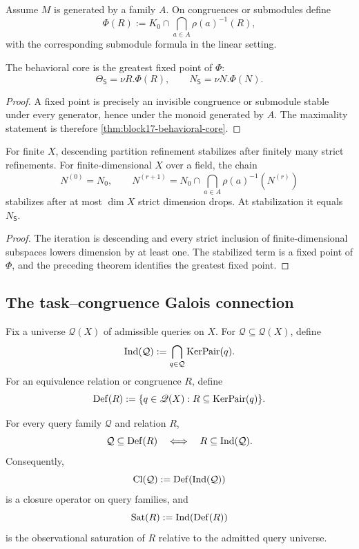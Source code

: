Assume \(M\) is generated by a family \(A\).  On congruences or submodules define
\[
 \Phi(R)
 :=
 K_0\cap\bigcap_{a\in A}\rho(a)^{-1}(R),
\]
with the corresponding submodule formula in the linear setting.

\begin{theorem}
\label{thm:block17-coinductive-characterization}
The behavioral core is the greatest fixed point of \(\Phi\):
\[
 \Theta_{\mathsf S}=\nu R.\Phi(R),
 \qquad
 N_{\mathsf S}=\nu N.\Phi(N).
\]
\end{theorem}

\begin{proof}
A fixed point is precisely an invisible congruence or submodule stable under every generator, hence under the monoid generated by \(A\).  The maximality statement is therefore \cref{thm:block17-behavioral-core}.
\end{proof}

\begin{corollary}
\label{cor:block17-finite-certification}
For finite \(X\), descending partition refinement stabilizes after finitely many strict refinements.  For finite-dimensional \(X\) over a field, the chain
\[
 N^{(0)}=N_0,
 \qquad
 N^{(r+1)}=
 N_0\cap\bigcap_{a\in A}\rho(a)^{-1}(N^{(r)})
\]
stabilizes after at most \(\dim X\) strict dimension drops.  At stabilization it equals \(N_{\mathsf S}\).
\end{corollary}

\begin{proof}
The iteration is descending and every strict inclusion of finite-dimensional subspaces lowers dimension by at least one.  The stabilized term is a fixed point of \(\Phi\), and the preceding theorem identifies the greatest fixed point.
\end{proof}

\subsection{The task--congruence Galois connection}
\label{subsec:block17-task-galois}

Fix a universe \(\mathscr Q(X)\) of admissible queries on \(X\).  For \(\mathcal Q\subseteq\mathscr Q(X)\), define
\[
 \operatorname{Ind}(\mathcal Q)
 :=
 \bigcap_{q\in\mathcal Q}\operatorname{KerPair}(q).
\]
For an equivalence relation or congruence \(R\), define
\[
 \operatorname{Def}(R)
 :=
 \{q\in\mathscr Q(X):R\subseteq\operatorname{KerPair}(q)\}.
\]

\begin{theorem}
\label{thm:block17-task-galois}
For every query family \(\mathcal Q\) and relation \(R\),
\[
 \mathcal Q\subseteq\operatorname{Def}(R)
 \quad\Longleftrightarrow\quad
 R\subseteq\operatorname{Ind}(\mathcal Q).
\]
Consequently,
\[
 \operatorname{Cl}(\mathcal Q):=\operatorname{Def}(\operatorname{Ind}(\mathcal Q))
\]
is a closure operator on query families, and
\[
 \operatorname{Sat}(R):=\operatorname{Ind}(\operatorname{Def}(R))
\]
is the observational saturation of \(R\) relative to the admitted query universe.
\end{theorem}

